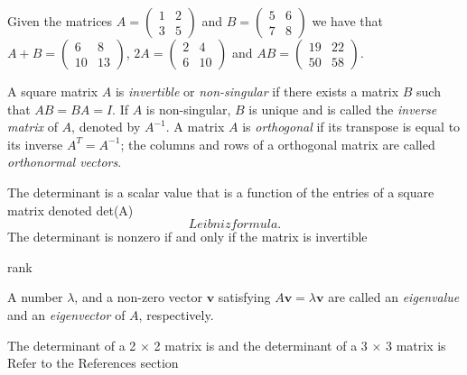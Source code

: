 \begin{example}
Given the matrices $A = \left( \begin{smallmatrix} 1 & 2 \\ 3 & 5 \end{smallmatrix} \right)$ and $B = \left( \begin{smallmatrix} 5 & 6 \\ 7 & 8 \end{smallmatrix} \right)$ we have that $A + B = \left( \begin{smallmatrix} 6 & 8 \\ 10 & 13 \end{smallmatrix} \right)$, $2 A = \left( \begin{smallmatrix} 2 & 4 \\ 6 & 10 \end{smallmatrix} \right)$ and $A B = \left( \begin{smallmatrix} 19 & 22 \\ 50 & 58 \end{smallmatrix} \right)$.
\end{example}

A square matrix $A$ is \emph{invertible} or \emph{non-singular} if there exists a matrix $B$ such that $AB = BA = I$. If $A$ is non-singular, $B$ is unique and is called the \emph{inverse matrix} of $A$, denoted by $A^{-1}$. A matrix $A$ is \emph{orthogonal} if its transpose is equal to its inverse $A^T = A^{-1}$; the columns and rows of a orthogonal matrix are called \emph{orthonormal vectors}.

The determinant is a scalar value that is a function of the entries of a square matrix denoted det(A)
\[
Leibniz formula.
\]
The determinant is nonzero if and only if the matrix is invertible

{\color{red} rank}

A number $\lambda$, and a non-zero vector $\mathbf{v}$ satisfying $A \mathbf{v} = \lambda \mathbf{v}$ are called an \emph{eigenvalue} and an \emph{eigenvector} of $A$, respectively.

\begin{example}
The determinant of a 2 × 2 matrix is
and the determinant of a 3 × 3 matrix is
Refer to the References section 
\end{example}

